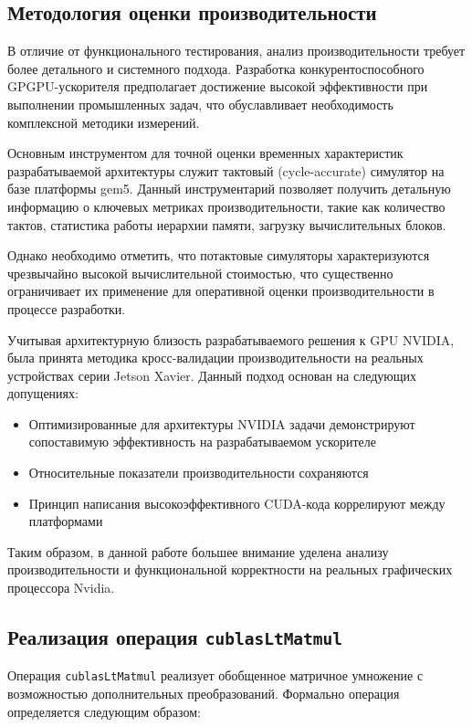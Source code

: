 \subsection{Методология оценки производительности}
\label{subsec:perf_eval}
В отличие от функционального тестирования, анализ производительности требует более детального и системного подхода.
Разработка конкурентоспособного GPGPU-ускорителя предполагает достижение высокой эффективности при выполнении промышленных
задач, что обуславливает необходимость комплексной методики измерений.

Основным инструментом для точной оценки временных характеристик разрабатываемой архитектуры служит тактовый (cycle-accurate) симулятор
на базе платформы gem5. Данный инструментарий позволяет получить детальную информацию о ключевых метриках производительности, такие как
количество тактов, статистика работы иерархии памяти, загрузку вычислительных блоков.

Однако необходимо отметить, что потактовые симуляторы характеризуются чрезвычайно высокой вычислительной стоимостью,
что существенно ограничивает их применение для оперативной оценки производительности в процессе разработки.

Учитывая архитектурную близость разрабатываемого решения к GPU NVIDIA, была принята методика кросс-валидации
производительности на реальных устройствах серии Jetson Xavier. Данный подход основан на следующих допущениях:
\begin{itemize}
    \item Оптимизированные для архитектуры NVIDIA задачи демонстрируют сопоставимую эффективность на разрабатываемом ускорителе
    \item Относительные показатели производительности сохраняются
    \item Принцип написания высокоэффективного CUDA-кода коррелируют между платформами
\end{itemize}

Таким образом, в данной работе большее внимание уделена анализу производительности и функциональной корректности
на реальных графических процессора Nvidia.

\subsection{Реализация операция \texttt{cublasLtMatmul}}
Операция \texttt{cublasLtMatmul} реализует обобщенное матричное умножение с возможностью дополнительных преобразований.
Формально операция определяется следующим образом:

